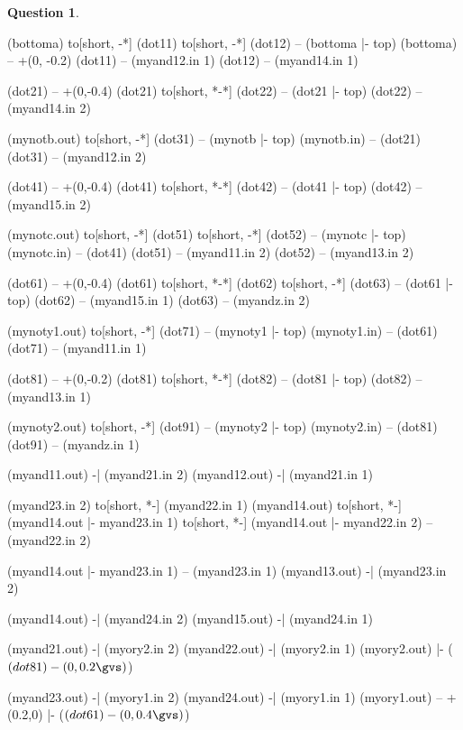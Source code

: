 \documentclass[11pt,a4paper,dvipsnames]{article}
\theoremstyle{definition}%
\newtheorem{Q}{Question}[] %
\newlength{\gvs}%
\begin{document}
\begin{Q}
{\begin{circuitikz}[scale=0.8, every node/.style={scale=0.8}]
				(bottoma) to[short, -*] (dot11) to[short, -*] (dot12) {} -- (bottoma |- top)
				(bottoma) -- +(0, -0.2\gvs)
				(dot11) -- (myand12.in 1)
				(dot12) -- (myand14.in 1)

				(dot21) -- +(0,-0.4\gvs)
				(dot21) to[short, *-*] (dot22) -- (dot21 |- top)
				(dot22) -- (myand14.in 2)

				(mynotb.out) to[short, -*] (dot31) -- (mynotb |- top)
				(mynotb.in) -- (dot21)
				(dot31) -- (myand12.in 2)

				(dot41) -- +(0,-0.4\gvs)
				(dot41) to[short, *-*] (dot42) -- (dot41 |- top)
				(dot42) -- (myand15.in 2)

				(mynotc.out) to[short, -*] (dot51) to[short, -*] (dot52) -- (mynotc |- top)
				(mynotc.in) -- (dot41)
				(dot51) -- (myand11.in 2)
				(dot52) -- (myand13.in 2)

				(dot61) -- +(0,-0.4\gvs)
				(dot61) to[short, *-*] (dot62) to[short, -*] (dot63) -- (dot61 |- top)
				(dot62) -- (myand15.in 1)
				(dot63) -- (myandz.in 2)

				(mynoty1.out) to[short, -*] (dot71) -- (mynoty1 |- top)
				(mynoty1.in) -- (dot61)
				(dot71) -- (myand11.in 1)

				(dot81) -- +(0,-0.2\gvs)
				(dot81) to[short, *-*] (dot82) -- (dot81 |- top)
				(dot82) -- (myand13.in 1)

				(mynoty2.out) to[short, -*] (dot91) -- (mynoty2 |- top)
				(mynoty2.in) -- (dot81)
				(dot91) -- (myandz.in 1)
				
				(myand11.out) -| (myand21.in 2)
				(myand12.out) -| (myand21.in 1)

				(myand23.in 2) to[short, *-] (myand22.in 1)
				(myand14.out) to[short, *-] (myand14.out |- myand23.in 1) to[short, *-] (myand14.out |- myand22.in 2) -- (myand22.in 2)

				(myand14.out |- myand23.in 1) -- (myand23.in 1)
				(myand13.out) -| (myand23.in 2)

				(myand14.out) -| (myand24.in 2)
				(myand15.out) -| (myand24.in 1)

				(myand21.out) -| (myory2.in 2)
				(myand22.out) -| (myory2.in 1)
				(myory2.out) |- ($(dot81)-(0,0.2\gvs)$)

				(myand23.out) -| (myory1.in 2)
				(myand24.out) -| (myory1.in 1)
				(myory1.out) -- +(0.2\gvs,0) |- ($(dot61)-(0,0.4\gvs)$)


\end{circuitikz}}
\end{Q}
\end{document}
